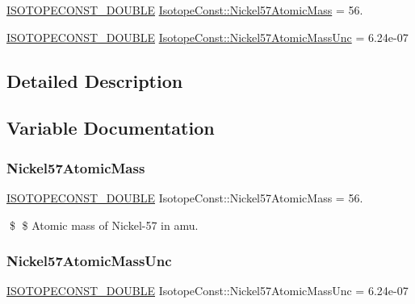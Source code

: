 \begin{DoxyCompactItemize}
\item 
\mbox{\hyperlink{group___isotope_const-_macros_ga8f45a7272ce02c0b4c65c44636ed719a}{I\+S\+O\+T\+O\+P\+E\+C\+O\+N\+S\+T\+\_\+\+D\+O\+U\+B\+LE}} \mbox{\hyperlink{group___isotope_const-_nickel-_ni57_gaaf5fab3481c1be3feb8bf4f0021170b2}{Isotope\+Const\+::\+Nickel57\+Atomic\+Mass}} = 56.
\item 
\mbox{\hyperlink{group___isotope_const-_macros_ga8f45a7272ce02c0b4c65c44636ed719a}{I\+S\+O\+T\+O\+P\+E\+C\+O\+N\+S\+T\+\_\+\+D\+O\+U\+B\+LE}} \mbox{\hyperlink{group___isotope_const-_nickel-_ni57_ga8cfd7762fab9d9bdbe0cc6e4bcc4cb95}{Isotope\+Const\+::\+Nickel57\+Atomic\+Mass\+Unc}} = 6.\+24e-\/07
\end{DoxyCompactItemize}


\subsection{Detailed Description}


\subsection{Variable Documentation}
\mbox{\label{group___isotope_const-_nickel-_ni57_gaaf5fab3481c1be3feb8bf4f0021170b2}} 
\subsubsection{\texorpdfstring{Nickel57\+Atomic\+Mass}{Nickel57AtomicMass}}
{\footnotesize\ttfamily \mbox{\hyperlink{group___isotope_const-_macros_ga8f45a7272ce02c0b4c65c44636ed719a}{I\+S\+O\+T\+O\+P\+E\+C\+O\+N\+S\+T\+\_\+\+D\+O\+U\+B\+LE}} Isotope\+Const\+::\+Nickel57\+Atomic\+Mass = 56.}

\$ \$ Atomic mass of Nickel-\/57 in amu. \mbox{\label{group___isotope_const-_nickel-_ni57_ga8cfd7762fab9d9bdbe0cc6e4bcc4cb95}} 
\subsubsection{\texorpdfstring{Nickel57\+Atomic\+Mass\+Unc}{Nickel57AtomicMassUnc}}
{\footnotesize\ttfamily \mbox{\hyperlink{group___isotope_const-_macros_ga8f45a7272ce02c0b4c65c44636ed719a}{I\+S\+O\+T\+O\+P\+E\+C\+O\+N\+S\+T\+\_\+\+D\+O\+U\+B\+LE}} Isotope\+Const\+::\+Nickel57\+Atomic\+Mass\+Unc = 6.\+24e-\/07}

